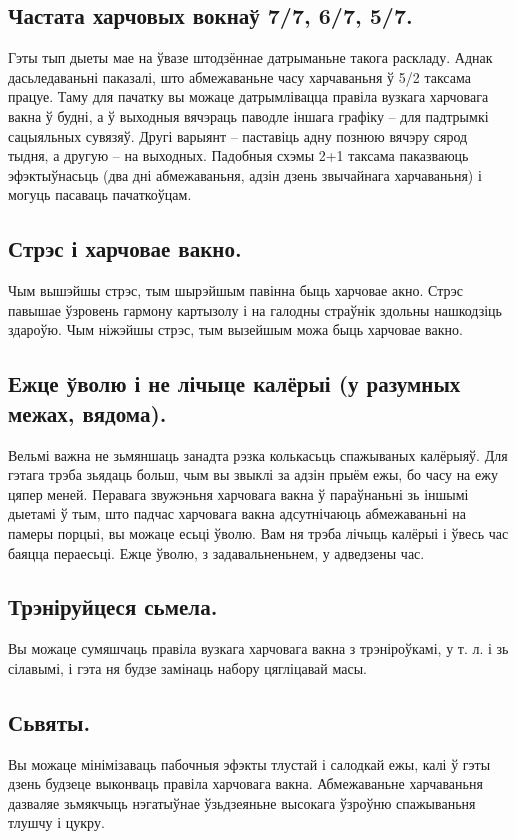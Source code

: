 \subsection{Частата харчовых вокнаў 7/7, 6/7, 5/7.}
Гэты тып дыеты мае на ўвазе штодзённае датрыманьне такога раскладу. Аднак дасьледаваньні паказалі, што абмежаваньне часу харчаваньня ў 5/2 таксама працуе. Таму для пачатку вы можаце датрымлівацца правіла вузкага харчовага вакна ў будні, а ў выходныя вячэраць паводле іншага графіку – для падтрымкі сацыяльных сувязяў. Другі варыянт – паставіць адну познюю вячэру сярод тыдня, а другую – на выходных. Падобныя схэмы 2+1 таксама паказваюць эфэктыўнасьць (два дні абмежаваньня, адзін дзень звычайнага харчаваньня) і могуць пасаваць пачаткоўцам.

\subsection{Стрэс і харчовае вакно.}
Чым вышэйшы стрэс, тым шырэйшым павінна быць харчовае акно. Стрэс павышае ўзровень гармону картызолу і на галодны страўнік здольны нашкодзіць здароўю. Чым ніжэйшы стрэс, тым вызейшым можа быць харчовае вакно.

\subsection{Ежце ўволю і не лічыце калёрыі (у разумных межах, вядома).}
Вельмі важна не зьмяншаць занадта рэзка колькасьць спажываных калёрыяў. Для гэтага трэба зьядаць больш, чым вы звыклі за адзін прыём ежы, бо часу на ежу цяпер меней. Перавага звужэньня харчовага вакна ў параўнаньні зь іншымі дыетамі ў тым, што падчас харчовага вакна адсутнічаюць абмежаваньні на памеры порцыі, вы можаце есьці ўволю. Вам ня трэба лічыць калёрыі і ўвесь час баяцца пераесьці. Ежце ўволю, з задавальненьнем, у адведзены час.

\subsection{Трэніруйцеся сьмела.}
Вы можаце сумяшчаць правіла вузкага харчовага вакна з трэніроўкамі, у т. л. і зь сілавымі, і гэта ня будзе замінаць набору цягліцавай масы.

\subsection{Сьвяты.}
Вы можаце мінімізаваць пабочныя эфэкты тлустай і салодкай ежы, калі ў гэты дзень будзеце выконваць правіла харчовага вакна. Абмежаваньне харчаваньня дазваляе зьмякчыць нэгатыўнае ўзьдзеяньне высокага ўзроўню спажываньня тлушчу і цукру.

